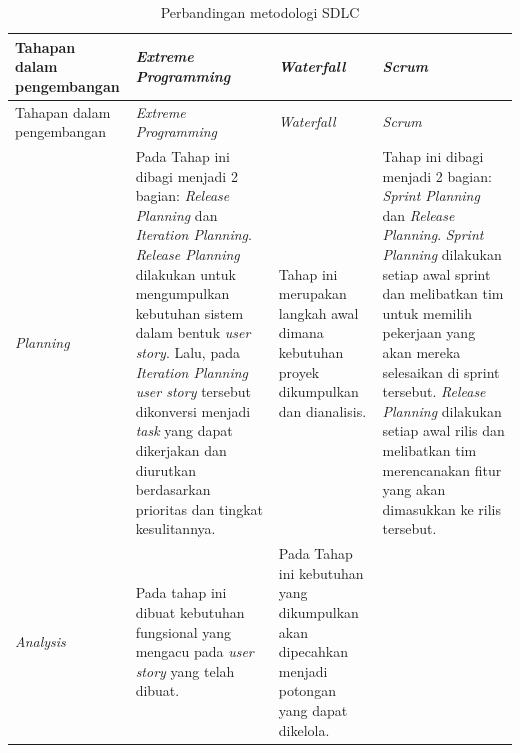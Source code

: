 \begin{longtable}[!h]
        {
            p{}
            p{}
            p{}
            p{}
        }
        \caption{Perbandingan metodologi SDLC} \\

        \hline
            Tahapan dalam pengembangan &
            \textit{Extreme Programming} &
            \textit{Waterfall} &
            \textit{Scrum} \\ [0.5ex]
        \hline

        \endfirsthead


        \hline
            Tahapan dalam pengembangan &
            \textit{Extreme Programming} &
            \textit{Waterfall} &
            \textit{Scrum} \\ [0.5ex]
        \hline
        \endhead %
        \hline

        \endfoot
        \hline
        \endlastfoot

        \textit{Planning}
        &
        Pada Tahap ini dibagi menjadi 2 bagian: \textit{Release Planning} dan \textit{Iteration Planning}. \textit{Release Planning} dilakukan untuk mengumpulkan kebutuhan sistem dalam bentuk \textit{user story}. Lalu, pada \textit{Iteration Planning} \textit{user story} tersebut dikonversi menjadi \textit{task} yang dapat dikerjakan dan diurutkan berdasarkan prioritas dan tingkat kesulitannya.
        &
        Tahap ini merupakan langkah awal dimana kebutuhan proyek dikumpulkan dan dianalisis.
        &
        Tahap ini dibagi menjadi 2 bagian: \textit{Sprint Planning} dan \textit{Release Planning}. \textit{Sprint Planning} dilakukan setiap awal sprint dan melibatkan tim untuk memilih pekerjaan yang akan mereka selesaikan di sprint tersebut. \textit{Release Planning} dilakukan setiap awal rilis dan melibatkan tim merencanakan fitur yang akan dimasukkan ke rilis tersebut.

        \\
        \midrule

        \textit{Analysis}
        &
        Pada tahap ini dibuat kebutuhan fungsional yang mengacu pada \textit{user story} yang telah dibuat.
        &
        Pada Tahap ini kebutuhan yang dikumpulkan akan dipecahkan menjadi potongan yang dapat dikelola.


\end{longtable}
